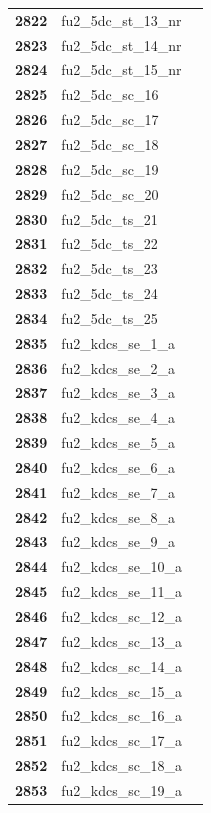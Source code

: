 \documentclass[
  letterpaper,
  DIV=11,
  numbers=noendperiod]{scrartcl}
\begin{document}
\begin{longtable}[t]{>{}cll}
\textbf{2822} & fu2\_5dc\_st\_13\_nr & \\
\textbf{2823} & fu2\_5dc\_st\_14\_nr & \\
\textbf{2824} & fu2\_5dc\_st\_15\_nr & \\
\textbf{2825} & fu2\_5dc\_sc\_16 & \\
\addlinespace
\textbf{2826} & fu2\_5dc\_sc\_17 & \\
\textbf{2827} & fu2\_5dc\_sc\_18 & \\
\textbf{2828} & fu2\_5dc\_sc\_19 & \\
\textbf{2829} & fu2\_5dc\_sc\_20 & \\
\textbf{2830} & fu2\_5dc\_ts\_21 & \\
\addlinespace
\textbf{2831} & fu2\_5dc\_ts\_22 & \\
\textbf{2832} & fu2\_5dc\_ts\_23 & \\
\textbf{2833} & fu2\_5dc\_ts\_24 & \\
\textbf{2834} & fu2\_5dc\_ts\_25 & \\
\textbf{2835} & fu2\_kdcs\_se\_1\_a & \\
\addlinespace
\textbf{2836} & fu2\_kdcs\_se\_2\_a & \\
\textbf{2837} & fu2\_kdcs\_se\_3\_a & \\
\textbf{2838} & fu2\_kdcs\_se\_4\_a & \\
\textbf{2839} & fu2\_kdcs\_se\_5\_a & \\
\textbf{2840} & fu2\_kdcs\_se\_6\_a & \\
\addlinespace
\textbf{2841} & fu2\_kdcs\_se\_7\_a & \\
\textbf{2842} & fu2\_kdcs\_se\_8\_a & \\
\textbf{2843} & fu2\_kdcs\_se\_9\_a & \\
\textbf{2844} & fu2\_kdcs\_se\_10\_a & \\
\textbf{2845} & fu2\_kdcs\_se\_11\_a & \\
\addlinespace
\textbf{2846} & fu2\_kdcs\_sc\_12\_a & \\
\textbf{2847} & fu2\_kdcs\_sc\_13\_a & \\
\textbf{2848} & fu2\_kdcs\_sc\_14\_a & \\
\textbf{2849} & fu2\_kdcs\_sc\_15\_a & \\
\textbf{2850} & fu2\_kdcs\_sc\_16\_a & \\
\addlinespace
\textbf{2851} & fu2\_kdcs\_sc\_17\_a & \\
\textbf{2852} & fu2\_kdcs\_sc\_18\_a & \\
\textbf{2853} & fu2\_kdcs\_sc\_19\_a & \\

\end{longtable}
\end{document}
